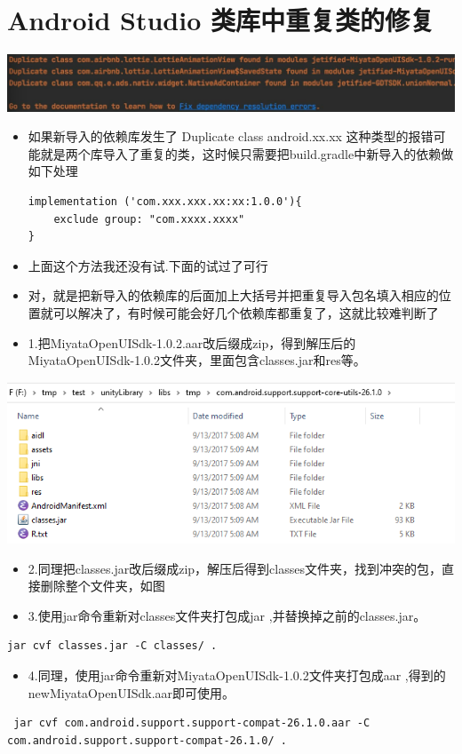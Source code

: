 \documentclass[9pt, b5paper]{article}
\begin{document}
\section{Android Studio 类库中重复类的修复}
\label{sec-7}

\includegraphics[width=.9\linewidth]{./pic/unityToAndroid_20221124_221720.png}
\begin{itemize}
\item 如果新导入的依赖库发生了 Duplicate class android.xx.xx 这种类型的报错可能就是两个库导入了重复的类，这时候只需要把build.gradle中新导入的依赖做如下处理
\begin{verbatim}
implementation ('com.xxx.xxx.xx:xx:1.0.0'){
    exclude group: "com.xxxx.xxxx"
}
\end{verbatim}
\item 上面这个方法我还没有试.下面的试过了可行
\item 对，就是把新导入的依赖库的后面加上大括号并把重复导入包名填入相应的位置就可以解决了，有时候可能会好几个依赖库都重复了，这就比较难判断了
\item 1.把MiyataOpenUISdk-1.0.2.aar改后缀成zip，得到解压后的MiyataOpenUISdk-1.0.2文件夹，里面包含classes.jar和res等。
\end{itemize}

\includegraphics[width=.9\linewidth]{./pic/unityToAndroid_20221124_221954.png}
\begin{itemize}
\item 2.同理把classes.jar改后缀成zip，解压后得到classes文件夹，找到冲突的包，直接删除整个文件夹，如图
\item 3.使用jar命令重新对classes文件夹打包成jar ,并替换掉之前的classes.jar。
\end{itemize}
\begin{verbatim}
jar cvf classes.jar -C classes/ .
\end{verbatim}
\begin{itemize}
\item 4.同理，使用jar命令重新对MiyataOpenUISdk-1.0.2文件夹打包成aar ,得到的newMiyataOpenUISdk.aar即可使用。
\end{itemize}
\begin{verbatim}
 jar cvf com.android.support.support-compat-26.1.0.aar -C com.android.support.support-compat-26.1.0/ .
\end{verbatim}
\end{document}
